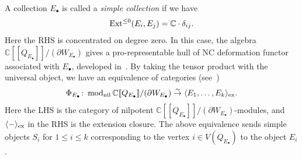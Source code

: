 \documentclass[11pt]{amsart}
\theoremstyle{plain}
\theoremstyle{definition}
\theoremstyle{remark}
\newcommand{\Ext}{\mathop{\rm Ext}\nolimits}
\newcommand{\modu}{\mathop{\rm mod}\nolimits}
\newcommand{\lkakko}{[\![}
\newcommand{\rkakko}{]\!]}
\begin{document}
A collection $E_{\bullet}$ is called
a \textit{simple collection}
if we have 
\begin{align}\label{Ext:simple}
\Ext^{\le 0}(E_i, E_j)=\mathbb{C} \cdot \delta_{ij}.
\end{align}
Here the RHS is 
concentrated on degree zero. 
In this case, the 
algebra $\mathbb{C} \lkakko Q_{E_{\bullet}} \rkakko/ 
(\partial W_{E_{\bullet}})$
gives a pro-representable hull of 
NC deformation functor associated with $E_{\bullet}$, 
developed in~\cite{Lau, Erik, Kawnc, BoBo}. 
By taking the tensor product with 
the universal object, we have an equivalence of 
categories (see~\cite[Corollary~6.7]{Todstack})
\begin{align}\label{equiv:NC}
\Phi_{E_{\bullet}} \colon 
\modu_{\rm{nil}}\mathbb{C} \lkakko Q_{E_{\bullet}} \rkakko/ 
(\partial W_{E_{\bullet}}) \stackrel{\sim}{\to}
\langle E_1, \ldots, E_k\rangle_{\rm{ex}}.
\end{align}
Here 
the LHS is the category of 
nilpotent $\mathbb{C} \lkakko Q_{E_{\bullet}} \rkakko/ 
(\partial W_{E_{\bullet}})$-modules, 
and $\langle -\rangle_{\rm{ex}}$ in the RHS 
is the extension closure. 
The above equivalence sends 
simple objects $S_i$ for $1\le i\le k$
corresponding to the vertex $i \in V(Q_{E_{\bullet}})$
to the object $E_i$. 
\end{document}
